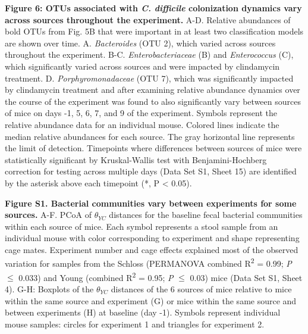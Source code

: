 \documentclass[
  11pt,
]{article}
\begin{document}
\newpage

\textbf{Figure 6: OTUs associated with \emph{C. difficile} colonization
dynamics vary across sources throughout the experiment.} A-D. Relative
abundances of bold OTUs from Fig. 5B that were important in at least two
classification models are shown over time. A. \emph{Bacteroides} (OTU
2), which varied across sources throughout the experiment. B-C.
\emph{Enterobacteriaceae} (B) and \emph{Enterococcus} (C), which
significantly varied across sources and were impacted by clindamycin
treatment. D. \emph{Porphyromonadaceae} (OTU 7), which was significantly
impacted by clindamycin treatment and after examining relative abundance
dynamics over the course of the experiment was found to also
significantly vary between sources of mice on days -1, 5, 6, 7, and 9 of
the experiment. Symbols represent the relative abundance data for an
individual mouse. Colored lines indicate the median relative abundances
for each source. The gray horizontal line represents the limit of
detection. Timepoints where differences between sources of mice were
statistically significant by Kruskal-Wallis test with Benjamini-Hochberg
correction for testing across multiple days (Data Set S1, Sheet 15) are
identified by the asterisk above each timepoint (*, P \textless{} 0.05).

\newpage

\textbf{Figure S1. Bacterial communities vary between experiments for
some sources.} A-F. PCoA of \(\theta_{YC}\) distances for the baseline
fecal bacterial communities within each source of mice. Each symbol
represents a stool sample from an individual mouse with color
corresponding to experiment and shape representing cage mates.
Experiment number and cage effects explained most of the observed
variation for samples from the Schloss (PERMANOVA combined
R\textsuperscript{2} = 0.99; \emph{P} \(\le\) 0.033) and Young (combined
R\textsuperscript{2} = 0.95; \emph{P} \(\le\) 0.03) mice (Data Set S1,
Sheet 4). G-H: Boxplots of the \(\theta_{YC}\) distances of the 6
sources of mice relative to mice within the same source and experiment
(G) or mice within the same source and between experiments (H) at
baseline (day -1). Symbols represent individual mouse samples: circles
for experiment 1 and triangles for experiment 2.

\newpage
\end{document}
